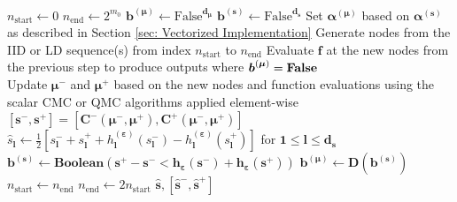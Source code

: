\documentclass[graybox]{svmult}
\begin{document}
\begin{algorithm}[t]
\begin{algorithmic}
    \\ \hrulefill
    \State $n_\text{start} \gets 0$ 
    \State $n_\text{end} \gets 2^{m_0}$ 
    \State $\boldsymbol{b}^{(\boldsymbol{\mu})} \gets \text{False}^{\boldsymbol{d}_{\boldsymbol{\mu}}}$ 
    \State $\boldsymbol{b}^{(\boldsymbol{s})} \gets \text{False}^{\boldsymbol{d}_{\boldsymbol{s}}}$ 
    \State Set $\boldsymbol{\alpha}^{(\boldsymbol{\mu})}$ based on $\boldsymbol{\alpha}^{(\boldsymbol{s})}$ as described in Section \ref{sec: Vectorized Implementation}
     
        \State Generate nodes from the IID or LD sequence(s) from index $n_\text{start}$ to $n_\text{end}$
        \State Evaluate $\boldsymbol{f}$ at the new nodes from the previous step to produce outputs where $\boldsymbol{b}^{(\boldsymbol{\mu})}=\textbf{\text{False}}$ \\ 
        \State Update $\boldsymbol{\mu}^-$ and $\boldsymbol{\mu}^+$ based on the new nodes and function evaluations using the scalar CMC or QMC algorithms applied element-wise 
        \State $[\boldsymbol{s}^-,\boldsymbol{s}^+] = \left[\boldsymbol{C}^-(\boldsymbol{\mu}^-,\boldsymbol{\mu}^+),\boldsymbol{C}^+(\boldsymbol{\mu}^-,\boldsymbol{\mu}^+)\right]$ 
        \State $\hat{s}_{\boldsymbol{l}} \gets \frac{1}{2}\left[s_{\boldsymbol{l}}^-+s_{\boldsymbol{l}}^++h^{(\boldsymbol{\varepsilon})}_{\boldsymbol{l}}(s_{\boldsymbol{l}}^-)-h^{(\boldsymbol{\varepsilon})}_{\boldsymbol{l}}(s_{\boldsymbol{l}}^+)\right]$ for $\boldsymbol{1} \leq \boldsymbol{l} \leq \boldsymbol{d}_{\boldsymbol{s}}$ 
        \State $\boldsymbol{b}^{(\boldsymbol{s})} \gets \textbf{Boolean}\left(\boldsymbol{s}^+-\boldsymbol{s}^- < \boldsymbol{h}_{\boldsymbol{\varepsilon}}(\boldsymbol{s}^-)+\boldsymbol{h}_{\boldsymbol{\varepsilon}}(\boldsymbol{s}^+)\right)$ 
        \State $\boldsymbol{b}^{(\boldsymbol{\mu})} \gets \boldsymbol{D}\left(\boldsymbol{b}^{(\boldsymbol{s})}\right)$
        \State $n_\text{start} \gets n_\text{end}$
        \State $n_\text{end} \gets 2n_\text{start}$
    \EndWhile
    \State \Return $\hat{\boldsymbol{s}},[\hat{\boldsymbol{s}}^-,\hat{\boldsymbol{s}}^+]$
    \end{algorithmic}
\end{algorithm}
\end{document}
